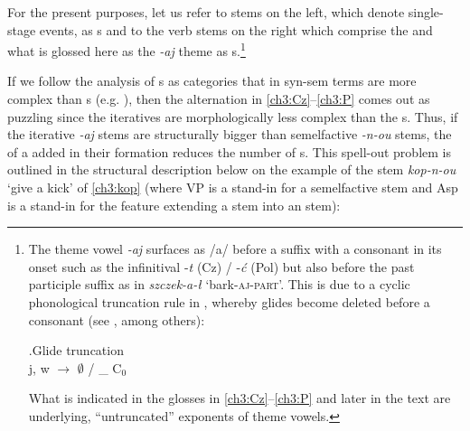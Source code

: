 For the present purposes, let us refer to  stems on the left, which denote single-stage events, as s and to the verb stems on the right which comprise the  and what is glossed here as the \textit{-aj} theme as s.\footnote{\label{fn:glidetruncation}The theme vowel \textit{-aj} surfaces as /a/ before a suffix with a consonant in its onset such as the infinitival -\textit{t} (Cz) / -\textit{\'c} (Pol) but also before the past participle suffix as in \textit{szczek-a-\l{}} `bark-\textsc{aj-part}'. This is due to a cyclic phonological truncation rule in , whereby glides become deleted before a consonant (see \citealt{Jakobson1948,Rubach1984}, among others): 

\ex.\label{GlideTr}Glide truncation\\[0.5ex] 
j, w $\rightarrow$ $\emptyset$  / \_ C$_{0}$

What is indicated in the glosses in \ref{ch3:Cz}--\ref{ch3:P} and later in the text are underlying, ``untruncated'' exponents of theme vowels. 
} %
\par
If we follow the analysis of s as categories that in syn-sem terms are more complex than s (e.g. \citealt{Smith1997,Olsen1997,Egg2017}),
then the alternation in \ref{ch3:Cz}--\ref{ch3:P} comes out as puzzling since the iteratives are morphologically less complex than the s. Thus, if the iterative \textit{-aj} stems are structurally bigger than semelfactive \textit{-n-ou} stems, the  of a  added in their formation reduces the number of s. This spell-out problem is outlined in the structural description below on the example of the stem \textit{kop-n-ou} `give a kick' of \ref{ch3:kop} (where VP is a stand-in for a semelfactive  stem and Asp is a stand-in for the feature extending a  stem into an  stem):


